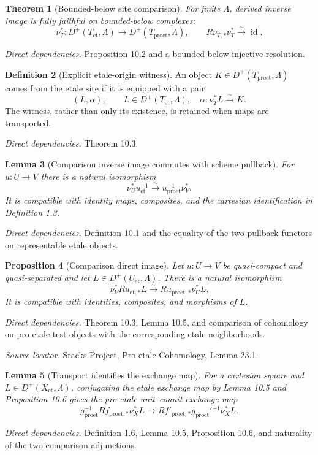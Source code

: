 \documentclass[10pt]{article}
\newtheorem{theorem}{Theorem}[section]
\newtheorem{proposition}[theorem]{Proposition}
\newtheorem{lemma}[theorem]{Lemma}
\theoremstyle{definition}
\newtheorem{definition}[theorem]{Definition}
\newcommand{\Dplus}{D^+}
\newcommand{\Et}{\mathrm{et}}
\newcommand{\Proet}{\mathrm{proet}}
\newcommand{\deps}[1]{\par\smallskip\textit{Direct dependencies.} #1\par}
\newcommand{\sources}[1]{\par\textit{Source locator.} #1\par}
\begin{document}
\begin{theorem}[Bounded-below site comparison]
For finite $\Lambda$, derived inverse image is fully faithful on
bounded-below complexes:
\[
 \nu_T^*:\Dplus(T_{\Et},\Lambda)
 \longrightarrow\Dplus(T_{\Proet},\Lambda),
 \qquad R\nu_{T,*}\nu_T^*\xrightarrow{\sim}\operatorname{id}.
\]
\end{theorem}
\deps{Proposition 10.2 and a bounded-below injective resolution.}

\begin{definition}[Explicit etale-origin witness]
An object $K\in\Dplus(T_{\Proet},\Lambda)$ comes from the etale site if it
is equipped with a pair
\[
 (L,\alpha),\qquad
 L\in\Dplus(T_{\Et},\Lambda),\quad
 \alpha:\nu_T^*L\xrightarrow{\sim}K.
\]
The witness, rather than only its existence, is retained when maps are
transported.
\end{definition}
\deps{Theorem 10.3.}

\begin{lemma}[Comparison inverse image commutes with scheme pullback]
For $u:U\to V$ there is a natural isomorphism
\[
 \nu_U^*u_{\Et}^{-1}\xrightarrow{\sim}
 u_{\Proet}^{-1}\nu_V^*.
\]
It is compatible with identity maps, composites, and the cartesian
identification in Definition 1.3.
\end{lemma}
\deps{Definition 10.1 and the equality of the two pullback functors on
representable etale objects.}

\begin{proposition}[Comparison direct image]
Let $u:U\to V$ be quasi-compact and quasi-separated and let
$L\in\Dplus(U_{\Et},\Lambda)$.  There is a natural isomorphism
\[
 \nu_V^*Ru_{\Et,*}L
 \xrightarrow{\sim}
 Ru_{\Proet,*}\nu_U^*L.
\]
It is compatible with identities, composites, and morphisms of $L$.
\end{proposition}
\deps{Theorem 10.3, Lemma 10.5, and comparison of cohomology on pro-etale
test objects with the corresponding etale neighborhoods.}
\sources{Stacks Project, Pro-etale Cohomology, Lemma 23.1.}

\begin{lemma}[Transport identifies the exchange map]
For a cartesian square and $L\in\Dplus(X_{\Et},\Lambda)$, conjugating the
etale exchange map by Lemma 10.5 and Proposition 10.6 gives the pro-etale
unit--counit exchange map
\[
 g_{\Proet}^{-1}Rf_{\Proet,*}\nu_X^*L
 \longrightarrow
 Rf'_{\Proet,*}g_{\Proet}'{}^{-1}\nu_X^*L.
\]
\end{lemma}
\deps{Definition 1.6, Lemma 10.5, Proposition 10.6, and naturality of the
two comparison adjunctions.}
\end{document}
